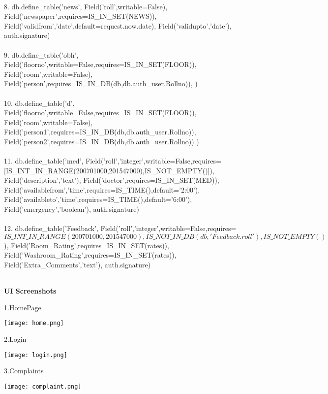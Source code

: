 \documentclass[a4paper,11pt]{article}
\begin{document}
\\
8. db.define\_table('news',
Field('roll',writable=False),
Field('newspaper',requires=IS\_IN\_SET(NEWS)),
Field('validfrom','date',default=request.now.date),
Field('validupto','date'),
auth.signature)
\\
\\
9. db.define\_table('obh',
Field('floorno',writable=False,requires=IS\_IN\_SET(FLOOR)),
Field('room',writable=False),
Field('person',requires=IS\_IN\_DB(db,db.auth\_user.Rollno)),
)
\\
\\
10. db.define\_table('d',
Field('floorno',writable=False,requires=IS\_IN\_SET(FLOOR)),
Field('room',writable=False),
Field('person1',requires=IS\_IN\_DB(db,db.auth\_user.Rollno)),
Field('person2',requires=IS\_IN\_DB(db,db.auth\_user.Rollno))
)
\\
\\
11. db.define\_table('med',
Field('roll','integer',writable=False,requires=[IS\_INT\_IN\_RANGE(200701000,201547000),IS\_NOT\_EMPTY()]),
Field('description','text'),
Field('doctor',requires=IS\_IN\_SET(MED)),
Field('availablefrom','time',requires=IS\_TIME(),default='2:00'),
Field('availableto','time',requires=IS\_TIME(),default='6:00'),
Field('emergency','boolean'),
auth.signature)
\\
\\
12. db.define\_table('Feedback',
Field('roll','integer',writable=False,requires=\[IS\_INT\_IN\_RANGE(200701000,201547000),IS\_NOT\_IN\_DB(db,'Feedback.roll'),IS\_NOT\_EMPTY()\]),
Field('Room\_Rating',requires=IS\_IN\_SET(rates)),
Field('Washroom\_Rating',requires=IS\_IN\_SET(rates)),
Field('Extra\_Comments','text'),
auth.signature)
\\
\\
\newpage

{\Large{\bfseries UI Screenshots}}

1.HomePage

\begin{center}
	\texttt{[image: home.png]}
\end{center}

2.Login

\begin{center}
	\texttt{[image: login.png]}
\end{center}

\newpage

3.Complaints

\begin{center}
	\texttt{[image: complaint.png]}
\end{center}
\end{document}
